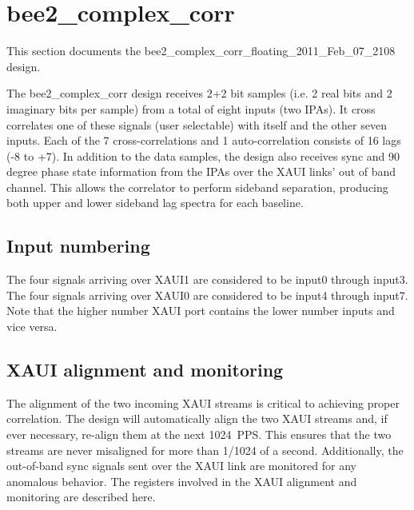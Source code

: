 \documentclass[12pt]{article}
\begin{document}
\section{bee2\_complex\_corr}

This section documents the bee2\_complex\_corr\_floating\_2011\_Feb\_07\_2108
design.

The bee2\_complex\_corr design receives 2+2 bit samples (i.e. 2 real bits and 2
imaginary bits per sample) from a total of eight inputs (two IPAs).  It cross
correlates one of these signals (user selectable) with itself and the other
seven inputs.  Each of the 7 cross-correlations and 1 auto-correlation consists
of 16 lags (-8 to +7).  In addition to the data samples, the design also
receives sync and 90 degree phase state information from the IPAs over the XAUI
links' out of band channel.  This allows the correlator to perform sideband
separation, producing both upper and lower sideband lag spectra for each
baseline.

\subsection{Input numbering}

The four signals arriving over XAUI1 are considered to be input0 through
input3.  The four signals arriving over XAUI0 are considered to be input4
through input7.  Note that the higher number XAUI port contains the lower
number inputs and vice versa.

\subsection{XAUI alignment and monitoring}

The alignment of the two incoming XAUI streams is critical to achieving proper
correlation.  The design will automatically align the two XAUI streams and, if
ever necessary, re-align them at the next 1024~PPS.  This ensures that the two
streams are never misaligned for more than 1/1024 of a second.  Additionally,
the out-of-band sync signals sent over the XAUI link are monitored for any
anomalous behavior.  The registers involved in the XAUI alignment and
monitoring are described here.
\end{document}
